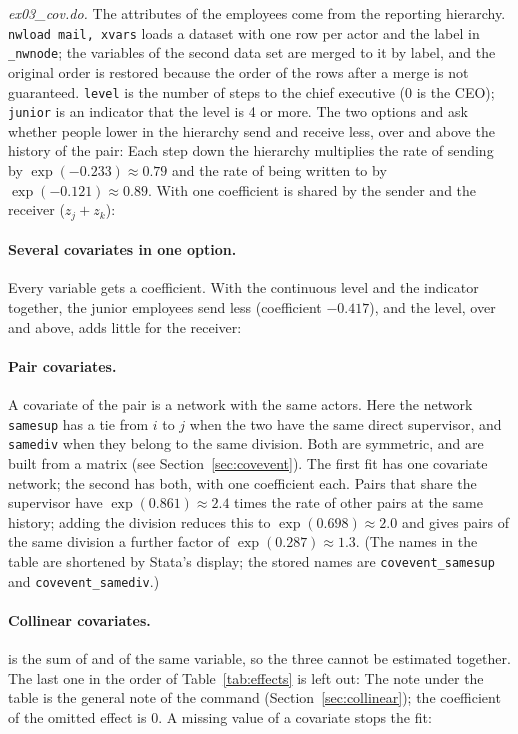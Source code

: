 \emph{ex03\_cov.do.} The attributes of the employees come from the reporting hierarchy. \texttt{nwload mail, xvars} loads a dataset with one row per actor and the label in \texttt{\_nwnode}; the variables of the second data set are merged to it by label, and the original order is restored because the order of the rows after a merge is not guaranteed.
\texttt{level} is the number of steps to the chief executive (0 is the CEO); \texttt{junior} is an indicator that the level is 4 or more. The two options  and  ask whether people lower in the hierarchy send and receive less, over and above the history of the pair:
Each step down the hierarchy multiplies the rate of sending by $\exp(-0.233)\approx0.79$ and the rate of being written to by $\exp(-0.121)\approx0.89$. With  one coefficient is shared by the sender and the receiver ($z_j+z_k$):
\paragraph{Several covariates in one option.} Every variable gets a coefficient. With the continuous level and the indicator together, the junior employees send less (coefficient $-0.417$), and the level, over and above, adds little for the receiver:
\paragraph{Pair covariates.} A covariate of the pair is a network with the same actors. Here the network \texttt{samesup} has a tie from $i$ to $j$ when the two have the same direct supervisor, and \texttt{samediv} when they belong to the same division. Both are symmetric, and are built from a matrix (see Section~\ref{sec:covevent}). The first fit has one covariate network; the second has both, with one coefficient each.
Pairs that share the supervisor have $\exp(0.861)\approx2.4$ times the rate of other pairs at the same history; adding the division reduces this to $\exp(0.698)\approx2.0$ and gives pairs of the same division a further factor of $\exp(0.287)\approx1.3$. (The names in the table are shortened by Stata's display; the stored names are \texttt{covevent\_samesup} and \texttt{covevent\_samediv}.)

\paragraph{Collinear covariates.}  is the sum of  and  of the same variable, so the three cannot be estimated together. The last one in the order of Table~\ref{tab:effects} is left out:
The note under the table is the general note of the command (Section~\ref{sec:collinear}); the coefficient of the omitted effect is 0. A missing value of a covariate stops the fit:

